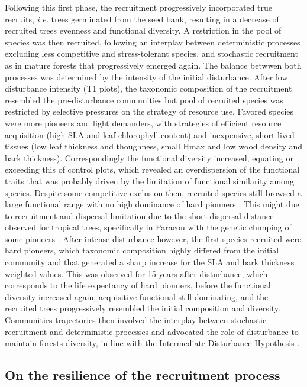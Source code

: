 \documentclass[fleqn,10pt]{ArtEcoFoG} %
\begin{document}
Following this first phase, the recruitment progressively incorporated
true recruits, \emph{i.e.} trees germinated from the seed bank,
resulting in a decrease of recruited trees evenness and functional
diversity. A restriction in the pool of species was then recruited,
following an interplay between deterministic processes excluding less
competitive and stress-tolerant species, and stochastic recruitment as
in mature forests that progressively emerged again. The balance betwwen
both processes was determined by the intensity of the initial
disturbance. After low disturbance intensity (T1 plots), the taxonomic
composition of the recruitment resembled the pre-disturbance communities
but pool of recruited species was restricted by selective pressures on
the strategy of resource use. Favored species were more pioneers and
light demanders, with strategies of efficient resource acquisition (high
SLA and leaf chlorophyll content) and inexpensive, short-lived tissues
(low leaf thickness and thoughness, small Hmax and low wood density and
bark thickness). Correspondingly the functional diversity increased,
equating or exceeding this of control plots, which revealed an
overdispersion of the functional traits that was probably driven by the
limitation of functional similarity among species. Despite some
competitive exclusion then, recruited species still browsed a large
functional range with no high dominance of hard pionners
\citep{Hubbell1999, Sheil2003, Bongers2009}. This might due to
recruitment and dispersal limitation due to the short dispersal distance
observed for tropical trees, specifically in Paracou with the genetic
clumping of some pioneers \citep{Leclerc2015, Scotti2015a}. After
intense disturbance however, the first species recruited were hard
pioneers, which taxonomic composition highly differed from the initial
community and that generated a sharp increase for the SLA and bark
thickness weighted values. This was observed for 15 years after
disturbance, which corresponds to the life expectancy of hard pionners,
before the functional diversity increased again, acquisitive functional
still dominating, and the recruited trees progressively resembled the
initial composition and diversity. Communities trajectories then
involved the interplay between stochastic recruitment and deterministic
processes and advocated the role of disturbance to maintain forests
diversity, in line with the Intermediate Disturbance Hypothesis
\citep{Molino2001, Sheil2003}.

\subsection{On the resilience of the recruitment
process}\label{on-the-resilience-of-the-recruitment-process}
\end{document}
